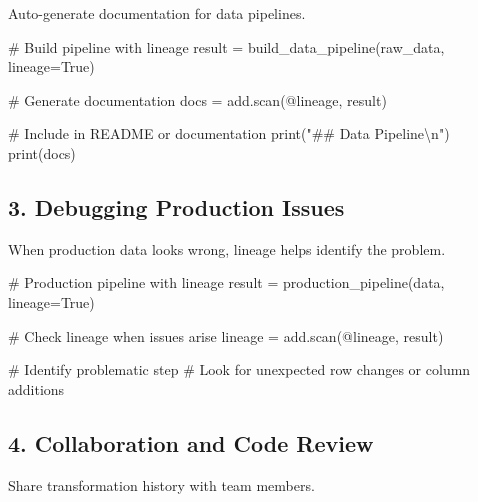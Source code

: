 \documentclass[
  letterpaper,
]{scrbook}
\newenvironment{Shaded}{\begin{snugshade}}{\end{snugshade}}
\newcommand{\BuiltInTok}[1]{\textcolor[rgb]{0.00,0.23,0.31}{#1}}
\newcommand{\CharTok}[1]{\textcolor[rgb]{0.13,0.47,0.30}{#1}}
\newcommand{\CommentTok}[1]{\textcolor[rgb]{0.37,0.37,0.37}{#1}}
\newcommand{\NormalTok}[1]{\textcolor[rgb]{0.00,0.23,0.31}{#1}}
\newcommand{\OperatorTok}[1]{\textcolor[rgb]{0.37,0.37,0.37}{#1}}
\newcommand{\StringTok}[1]{\textcolor[rgb]{0.13,0.47,0.30}{#1}}
\newcommand{\VariableTok}[1]{\textcolor[rgb]{0.07,0.07,0.07}{#1}}
\begin{document}
Auto-generate documentation for data pipelines.

\begin{Shaded}
\begin{Highlighting}[]
\CommentTok{\# Build pipeline with lineage}
\NormalTok{result }\OperatorTok{=}\NormalTok{ build\_data\_pipeline(raw\_data, lineage}\OperatorTok{=}\VariableTok{True}\NormalTok{)}

\CommentTok{\# Generate documentation}
\NormalTok{docs }\OperatorTok{=}\NormalTok{ add.scan(}\StringTok{\textquotesingle{}@lineage\textquotesingle{}}\NormalTok{, result)}

\CommentTok{\# Include in README or documentation}
\BuiltInTok{print}\NormalTok{(}\StringTok{"\#\# Data Pipeline}\CharTok{\textbackslash{}n}\StringTok{"}\NormalTok{)}
\BuiltInTok{print}\NormalTok{(docs)}
\end{Highlighting}
\end{Shaded}

\subsection{3. Debugging Production
Issues}\label{debugging-production-issues}

When production data looks wrong, lineage helps identify the problem.

\begin{Shaded}
\begin{Highlighting}[]
\CommentTok{\# Production pipeline with lineage}
\NormalTok{result }\OperatorTok{=}\NormalTok{ production\_pipeline(data, lineage}\OperatorTok{=}\VariableTok{True}\NormalTok{)}

\CommentTok{\# Check lineage when issues arise}
\NormalTok{lineage }\OperatorTok{=}\NormalTok{ add.scan(}\StringTok{\textquotesingle{}@lineage\textquotesingle{}}\NormalTok{, result)}

\CommentTok{\# Identify problematic step}
\CommentTok{\# Look for unexpected row changes or column additions}
\end{Highlighting}
\end{Shaded}

\subsection{4. Collaboration and Code
Review}\label{collaboration-and-code-review}

Share transformation history with team members.
\end{document}
